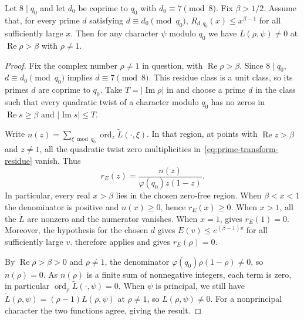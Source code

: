 \begin{theorem}
\label{thm:criterion}
\emitthmsource
Let $8\mid q_0$ and let $d_0$ be coprime to $q_0$ with $d_0\equiv7\pmod 8$. Fix $\beta>1/2$. Assume that, for every prime $d$ satisfying $d\equiv d_0\pmod{q_0}$, $R_{d,q_0}(x)\le x^{\beta-1}$ for all sufficiently large $x$. Then for any character $\psi$ modulo $q_0$ we have $L(\rho,\psi)\ne0$ at $\operatorname{Re}\rho>\beta$ with $\rho\ne1$.
\end{theorem}
\begin{proof}
Fix the complex number $\rho\ne1$ in question, with $\operatorname{Re}\rho>\beta$. Since $8\mid q_0$, $d\equiv d_0\pmod{q_0}$ implies $d\equiv7\pmod8$. This residue class is a unit class, so its primes $d$ are coprime to $q_0$. Take $T=|\operatorname{Im}\rho|$ in  and choose a prime $d$ in the class such that every quadratic twist of a character modulo $q_0$ has no zeros in $\operatorname{Re}s\ge\beta$ and $|\operatorname{Im}s|\le T$.

Write $n(z)=\sum_{\xi\bmod q_0}\operatorname{ord}_z\widetilde L(\cdot,\xi)$. In that region, at points with $\operatorname{Re}z>\beta$ and $z\ne1$, all the quadratic twist zero multiplicities in~\eqref{eq:prime-transform-residue} vanish. Thus
\[
 r_E(z)=\frac{n(z)}{\varphi(q_0)z(1-z)}.
\]
In particular, every real $x>\beta$ lies in the chosen zero-free region. When $\beta<x<1$ the denominator is positive and $n(x)\ge0$, hence $r_E(x)\ge0$. When $x>1$, all the $\widetilde L$ are nonzero and the numerator vanishes. When $x=1$,  gives $r_E(1)=0$. Moreover, the hypothesis for the chosen $d$ gives $E(v)\le e^{(\beta-1)v}$ for all sufficiently large $v$.  therefore applies and gives $r_E(\rho)=0$.

By $\operatorname{Re}\rho>\beta>0$ and $\rho\ne1$, the denominator $\varphi(q_0)\rho(1-\rho)\ne0$, so $n(\rho)=0$. As $n(\rho)$ is a finite sum of nonnegative integers, each term is zero, in particular $\operatorname{ord}_\rho\widetilde L(\cdot,\psi)=0$. When $\psi$ is principal, we still have $\widetilde L(\rho,\psi)=(\rho-1)L(\rho,\psi)$ at $\rho\ne1$, so $L(\rho,\psi)\ne0$. For a nonprincipal character the two functions agree, giving the result.
\end{proof}

